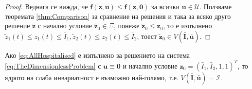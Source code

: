 \begin{proof}
  Веднага се вижда, че $\mathbf{f}(\mathbf{z}, \mathbf{u}) \leq \mathbf{f}(\mathbf{z}, \mathbf{0})$ за всички $\mathbf{u} \in \mathscr{U}$.
  Ползваме теоремата \eqref{thm:Comparison} за сравнение на решения и така за всяко друго решение $\tilde{\mathbf{z}}$ с начално условие $\tilde{\mathbf{z}}_0 \in \Xi$, понеже $\tilde{\mathbf{z}}_0 \leq \mathbf{z}_0$, то е изпълнено $\tilde{z}_1(t) \leq z_1(t) \leq \bar{I}_1, \tilde{z}_2(t) \leq z_2(t) \leq \bar{I}_2$, тоест $\tilde{\mathbf{z}}_0 \in V(\bar{\mathbf{I}}, \bar{\mathbf{u}})$.
\end{proof}

\begin{corollary}
  Ако \eqref{eq:AllHospitalised} е изпълнено за решението на система \eqref{eq:TheDimensionlessProblem} с $\mathbf{u} \equiv \mathbf{0}$ и начално условие $\mathbf{z}_0 = (\bar{I}_1, \bar{I}_2, 1, 1)^T$, то ядрото на слаба инвариатност е възможно най-голямо, т.е. $V(\bar{\mathbf{I}}, \bar{\mathbf{u}}) = \mathscr{I}$.
\end{corollary}

